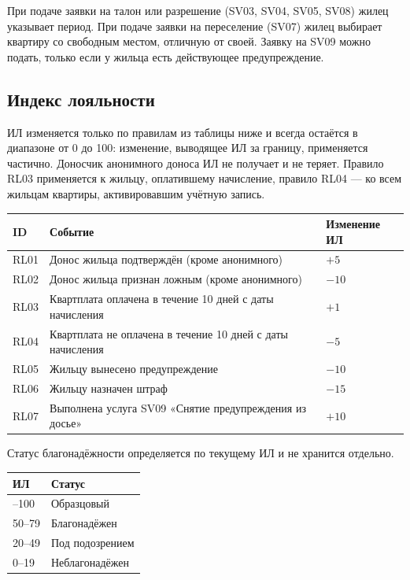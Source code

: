 \documentclass[12pt,a4paper]{article}
\begin{document}
При подаче заявки на талон или разрешение (SV03, SV04, SV05, SV08) жилец
указывает период. При подаче заявки на переселение (SV07) жилец выбирает
квартиру со свободным местом, отличную от своей. Заявку на SV09 можно подать, только
если у жильца есть действующее предупреждение.

\subsection{Индекс лояльности}\label{sec:il}

ИЛ изменяется только по правилам из таблицы ниже и всегда остаётся в
диапазоне от 0 до 100: изменение, выводящее ИЛ за границу, применяется
частично. Доносчик анонимного доноса ИЛ не получает и не теряет. Правило RL03
применяется к жильцу, оплатившему начисление, правило RL04 --- ко всем
жильцам квартиры, активировавшим учётную запись.

\begin{longtable}{L{14mm} L{110mm} L{24mm}}
\toprule
\textbf{ID} & \textbf{Событие} & \textbf{Изменение ИЛ} \\
\midrule
\endhead
\bottomrule
\endfoot
RL01 & Донос жильца подтверждён (кроме анонимного) & $+5$ \\
RL02 & Донос жильца признан ложным (кроме анонимного) & $-10$ \\
RL03 & Квартплата оплачена в течение 10 дней с даты начисления & $+1$ \\
RL04 & Квартплата не оплачена в течение 10 дней с даты начисления & $-5$ \\
RL05 & Жильцу вынесено предупреждение & $-10$ \\
RL06 & Жильцу назначен штраф & $-15$ \\
RL07 & Выполнена услуга SV09 «Снятие предупреждения из досье» & $+10$ \\
\end{longtable}

Статус благонадёжности определяется по текущему ИЛ и не хранится отдельно.

\begin{longtable}{L{40mm} L{40mm}}
\toprule
\textbf{ИЛ} & \textbf{Статус} \\
\midrule
\endhead
\bottomrule
{}--100 & Образцовый \\
50--79 & Благонадёжен \\
20--49 & Под подозрением \\
0--19 & Неблагонадёжен \\
\end{longtable}
\end{document}
